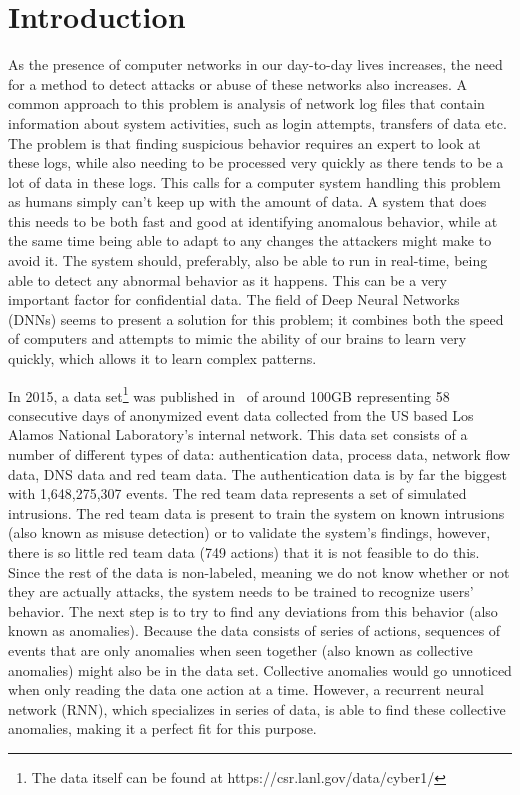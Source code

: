 \chapter{Introduction}\label{ch:introduction}
As the presence of computer networks in our day-to-day lives increases, the need for a method to detect attacks or abuse of these networks also increases. A common approach to this problem is analysis of network log files that contain information about system activities, such as login attempts, transfers of data etc. The problem is that finding suspicious behavior requires an expert to look at these logs, while also needing to be processed very quickly as there tends to be a lot of data in these logs. This calls for a computer system handling this problem as humans simply can't keep up with the amount of data. A system that does this needs to be both fast and good at identifying anomalous behavior, while at the same time being able to adapt to any changes the attackers might make to avoid it. The system should, preferably, also be able to run in real-time, being able to detect any abnormal behavior as it happens. This can be a very important factor for confidential data. The field of Deep Neural Networks (DNNs) seems to present a solution for this problem; it combines both the speed of computers and attempts to mimic the ability of our brains to learn very quickly, which allows it to learn complex patterns.

In 2015, a data set\footnote{The data itself can be found at https://csr.lanl.gov/data/cyber1/} was published in~\cite{akent-2015-enterprise-data} of around 100GB representing 58 consecutive days of anonymized event data collected from the US based Los Alamos National Laboratory's internal network. This data set consists of a number of different types of data: authentication data, process data, network flow data, DNS data and red team data. The authentication data is by far the biggest with 1,648,275,307 events. The red team data represents a set of simulated intrusions. The red team data is present to train the system on known intrusions (also known as misuse detection) or to validate the system's findings, however, there is so little red team data (749 actions) that it is not feasible to do this. Since the rest of the data is non-labeled, meaning we do not know whether or not they are actually attacks, the system needs to be trained to recognize users' behavior. The next step is to try to find any deviations from this behavior (also known as anomalies). Because the data consists of series of actions, sequences of events that are only anomalies when seen together (also known as collective anomalies) might also be in the data set. Collective anomalies would go unnoticed when only reading the data one action at a time. However, a recurrent neural network (RNN), which specializes in series of data, is able to find these collective anomalies, making it a perfect fit for this purpose.


